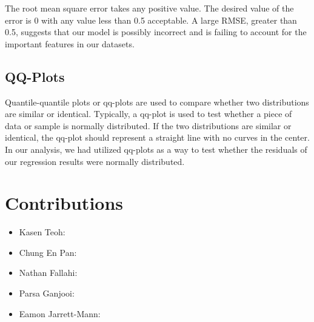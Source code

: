 \documentclass[12pt, letterpaper]{article}
\begin{document}
The root mean square error takes any positive value. The desired value of the error is 0 with any value less than 0.5 acceptable. A large RMSE, greater than 0.5, suggests that our model is possibly incorrect and is failing to account for the important features in our datasets.  

\subsection{QQ-Plots}
Quantile-quantile plots or qq-plots are used to compare whether two distributions are similar or identical. Typically, a qq-plot is used to test whether a piece of data or sample is normally distributed. If the two distributions are similar or identical, the qq-plot should represent a straight line with no curves in the center. In our analysis, we had utilized qq-plots as a way to test whether the residuals of our regression results were normally distributed. 

\section{Contributions}
\begin{itemize}
    \item Kasen Teoh: 
    \item Chung En Pan: 
    \item Nathan Fallahi: 
    \item Parsa Ganjooi: 
    \item Eamon Jarrett-Mann: 
\end{itemize}




\end{document}
